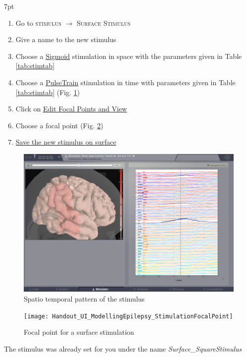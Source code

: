 \documentclass{tufte-handout}
\newenvironment{formal}{%
  \def\FrameCommand{%
    \hspace{1pt}%
    {\color{DarkBlue}\vrule width 2pt}%
    {\color{formalshade}\vrule width 4pt}%
    \colorbox{formalshade}%
  }%
  \MakeFramed{\advance\hsize-\width\FrameRestore}%
  \noindent\hspace{-4.55pt}%
  \begin{adjustwidth}{}{7pt}%
  \vspace{2pt}\vspace{2pt}%
}
{%
  \vspace{2pt}\end{adjustwidth}\endMakeFramed%
}
\begin{document}
  \begin{formal}
  \begin{enumerate}
  \item Go to \textsc{stimulus} $\rightarrow$ \textsc{Surface Stimulus}
  \item Give a name to the new stimulus
  \item Choose a \underline{Sigmoid} stimulation in space with the parameters given in Table \ref{tab:stimtab}
  \item Choose a \underline{PulseTrain} stimulation in time with parameters given in Table \ref{tab:stimtab} (Fig. \ref{fig:stim_st})
  \item Click on \underline{Edit Focal Points and View}
  \item Choose a focal point (Fig. \ref{fig:stim_foc})
  \item \underline{Save the new stimulus on surface}
  \end{enumerate}
\end{formal}


\begin{figure}[h]
  \includegraphics[width=\linewidth]{Handout_UI_ModellingEpilepsy_SpatialAverage}%
  \caption{Spatio temporal pattern of the stimulus}%
  \label{fig:stim_st}%
\end{figure}

\begin{figure}[h]
  \texttt{[image: Handout\_UI\_ModellingEpilepsy\_StimulationFocalPoint]}%
  \caption{Focal point for a surface stimulation}%
  \label{fig:stim_foc}%
\end{figure}

The stimulus was already set for you under the name \textit{Surface\_SquareStimulus}
\end{document}
